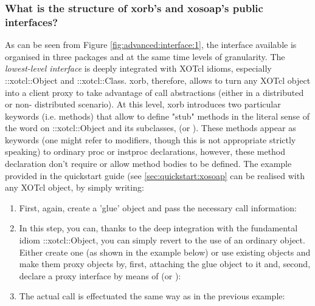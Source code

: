   \subsubsection{What is the structure of xorb's and xosoap's public interfaces?}\label{sec:advanced:interface:what}
  As can be seen from Figure \ref{fig:advanced:interface:1}, the interface available is organised in three 
packages and at the same time levels of granularity. The \emph{lowest-level interface} is deeply 
integrated with XOTcl idioms, especially ::xotcl::Object and ::xotcl::Class. xorb, therefore, allows to turn 
any XOTcl object into a client proxy to take advantage of call abstractions (either in a distributed or non-
distributed scenario). At this level, xorb introduces two particular keywords (i.e. methods) that allow to 
define "stub" methods in the literal sense of the word on ::xotcl::Object and its subclasses, 
(or ). These methods appear as keywords (one might refer to modifiers, though this is 
not appropriate strictly speaking) to ordinary proc or instproc declarations, however, these method 
declaration don't require or allow method bodies to be defined. The example provided in the quickstart 
guide (see \ref{sec:quickstart:xosoap} can be realised with any XOTcl object, by simply writing:
  \begin{enumerate}
\item First, again, create a 'glue' object and pass the necessary call information: 
\item In this step, you can, thanks to the deep integration with the fundamental idiom ::xotcl::Object, you 
can simply revert to the use of an ordinary object. Either create one (as shown in the example below) or 
use existing objects and make them proxy objects by, first, attaching the glue object to it and, second, 
declare a proxy interface by means of  (or ):


\item The actual call is effectuated the same way as in the previous example:

  \end{enumerate}
